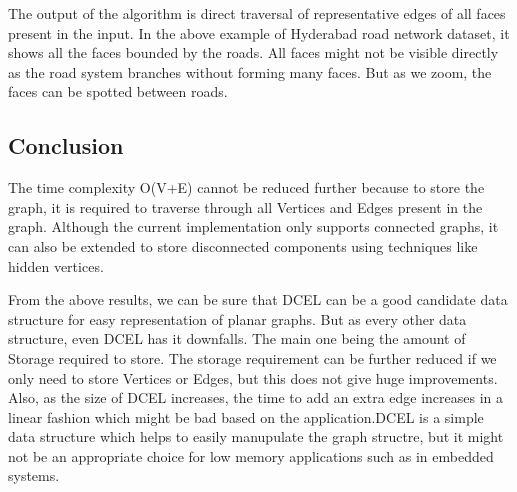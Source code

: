 The output of the algorithm is direct traversal of representative edges
of all faces present in the input. In the above example of Hyderabad
road network dataset, it shows all the faces bounded by the roads. All
faces might not be visible directly as the road system branches without
forming many faces. But as we zoom, the faces can be spotted between
roads.

\hypertarget{conclusion}{%
\subsection{Conclusion}\label{conclusion}}

The time complexity O(V+E) cannot be reduced further because to store
the graph, it is required to traverse through all Vertices and Edges
present in the graph. Although the current implementation only supports
connected graphs, it can also be extended to store disconnected
components using techniques like hidden vertices.

From the above results, we can be sure that DCEL can be a good candidate
data structure for easy representation of planar graphs. But as every
other data structure, even DCEL has it downfalls. The main one being the
amount of Storage required to store. The storage requirement can be
further reduced if we only need to store Vertices or Edges, but this
does not give huge improvements. Also, as the size of DCEL increases,
the time to add an extra edge increases in a linear fashion which might
be bad based on the application.DCEL is a simple data structure which
helps to easily manupulate the graph structre, but it might not be an
appropriate choice for low memory applications such as in embedded
systems.

